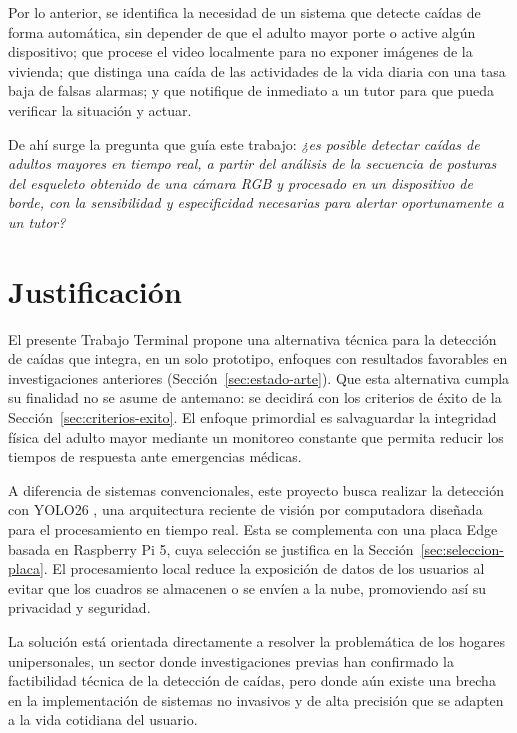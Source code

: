 \documentclass[12pt,a4paper,oneside]{book}
\theoremstyle{plain}
\theoremstyle{definition}
\theoremstyle{remark}
\begin{document}
Por lo anterior, se identifica la necesidad de un sistema que detecte caídas de forma automática, sin depender de que el adulto mayor porte o active algún dispositivo; que procese el video localmente para no exponer imágenes de la vivienda; que distinga una caída de las actividades de la vida diaria con una tasa baja de falsas alarmas; y que notifique de inmediato a un tutor para que pueda verificar la situación y actuar.
 
De ahí surge la pregunta que guía este trabajo: \textit{¿es posible detectar caídas de adultos mayores en tiempo real, a partir del análisis de la secuencia de posturas del esqueleto obtenido de una cámara RGB y procesado en un dispositivo de borde, con la sensibilidad y especificidad necesarias para alertar oportunamente a un tutor?}

\section{Justificación}
El presente Trabajo Terminal propone una alternativa técnica para la detección de caídas que integra, en un solo prototipo, enfoques con resultados favorables en investigaciones anteriores (Sección~\ref{sec:estado-arte}). Que esta alternativa cumpla su finalidad no se asume de antemano: se decidirá con los criterios de éxito de la Sección~\ref{sec:criterios-exito}. El enfoque primordial es salvaguardar la integridad física del adulto mayor mediante un monitoreo constante que permita reducir los tiempos de respuesta ante emergencias médicas.

A diferencia de sistemas convencionales, este proyecto busca realizar la detección con YOLO26 \parencite{ultralytics2026yolo26}, una arquitectura reciente de visión por computadora diseñada para el procesamiento en tiempo real. Esta se complementa con una placa Edge basada en Raspberry Pi 5, cuya selección se justifica en la Sección~\ref{sec:seleccion-placa}. El procesamiento local reduce la exposición de datos de los usuarios al evitar que los cuadros se almacenen o se envíen a la nube, promoviendo así su privacidad y seguridad.

La solución está orientada directamente a resolver la problemática de los hogares unipersonales, un sector donde investigaciones previas han confirmado la factibilidad técnica de la detección de caídas, pero donde aún existe una brecha en la implementación de sistemas no invasivos y de alta precisión que se adapten a la vida cotidiana del usuario.
\end{document}
